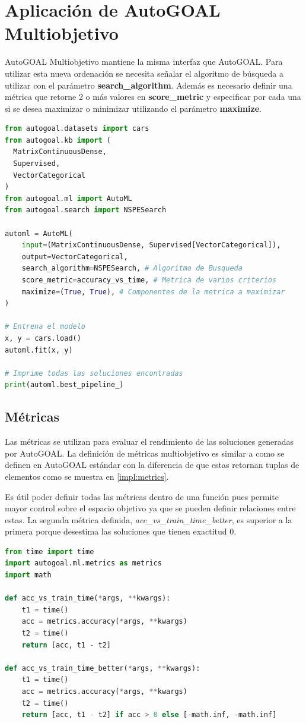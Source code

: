 \section{Aplicaci\'on de AutoGOAL Multiobjetivo}
AutoGOAL Multiobjetivo mantiene la misma interfaz que AutoGOAL. Para utilizar esta nueva ordenaci\'on se necesita  se\~nalar el algoritmo de b\'usqueda a utilizar con el par\'ametro \textbf{search\_algorithm}. Adem\'as es necesario definir una m\'etrica que retorne 2 o m\'as valores en \textbf{score\_metric} y especificar por cada una si se desea maximizar o minimizar utilizando el par\'ametro  \textbf{maximize}. 

\begin{lstlisting}[caption=Uso de AutoGOAL con multiobjetivo, language=Python]
from autogoal.datasets import cars
from autogoal.kb import (
  MatrixContinuousDense,
  Supervised,
  VectorCategorical
)
from autogoal.ml import AutoML
from autogoal.search import NSPESearch

automl = AutoML(
    input=(MatrixContinuousDense, Supervised[VectorCategorical]),
    output=VectorCategorical,
    search_algorithm=NSPESearch, # Algoritmo de Busqueda
    score_metric=accuracy_vs_time, # Metrica de varios criterios
    maximize=(True, True), # Componentes de la metrica a maximizar
)

# Entrena el modelo
x, y = cars.load()
automl.fit(x, y)

# Imprime todas las soluciones encontradas
print(automl.best_pipeline_) 
\end{lstlisting}

\subsection{M\'etricas}
Las m\'etricas se utilizan para evaluar el rendimiento de las soluciones generadas por AutoGOAL.
La definici\'on de m\'etricas multiobjetivo  es similar a como se definen en AutoGOAL est\'andar con la diferencia de que estas retornan tuplas de elementos como se muestra en \ref{impl:metrics}. 

Es \'util poder definir todas las m\'etricas dentro de una funci\'on pues permite mayor control sobre el espacio objetivo ya que se pueden definir relaciones entre estas. La segunda m\'etrica definida, \textit{acc\_vs\_train\_time\_better}, es superior a la primera porque desestima las soluciones que tienen exactitud 0.

\begin{lstlisting}[caption=Ejemplo de m\'etrica: \textit{accuracy} contra tiempo, language=Python, label=impl:metrics]
from time import time
import autogoal.ml.metrics as metrics
import math

def acc_vs_train_time(*args, **kwargs):
    t1 = time()
    acc = metrics.accuracy(*args, **kwargs)
    t2 = time()
    return [acc, t1 - t2]

def acc_vs_train_time_better(*args, **kwargs):
    t1 = time()
    acc = metrics.accuracy(*args, **kwargs)
    t2 = time()
    return [acc, t1 - t2] if acc > 0 else [-math.inf, -math.inf]
\end{lstlisting}
